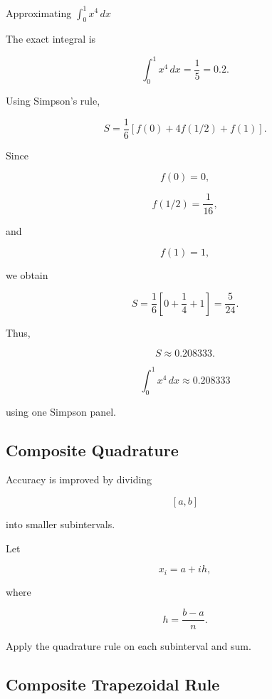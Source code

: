 \begin{workedexamplebox}{Approximating \(\int_0^1 x^4\,dx\)}

The exact integral is

\[
\int_0^1
x^4\,dx
=
\frac15
=
0.2.
\]

Using Simpson's rule,

\[
S
=
\frac16
\left[
f(0)
+
4f(1/2)
+
f(1)
\right].
\]

Since

\[
f(0)=0,
\]

\[
f(1/2)=\frac1{16},
\]

and

\[
f(1)=1,
\]

we obtain

\[
S
=
\frac16
\left[
0
+
\frac14
+
1
\right]
=
\frac{5}{24}.
\]

Thus,

\[
S
\approx0.208333.
\]

\begin{answerbox}
\[
\boxed{
\int_0^1x^4\,dx
\approx0.208333
}
\]

using one Simpson panel.
\end{answerbox}

\end{workedexamplebox}

\subsection{Composite Quadrature}
\label{subsec:composite-quadrature}

Accuracy is improved by dividing

\[
[a,b]
\]

into smaller subintervals.

Let

\[
x_i
=
a+ih,
\]

where

\[
\boxed{
h
=
\frac{
b-a
}{
n
}.
}
\]

Apply the quadrature rule on each subinterval and sum.

\subsection{Composite Trapezoidal Rule}
\label{subsec:composite-trapezoidal}


